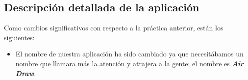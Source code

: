 \documentclass[12pt,a4paper]{article}
\begin{document}
\subsection{Descripción detallada de la aplicación}

Como cambios significativos con respecto a la práctica anterior, están los siguientes:

\begin{itemize}
    \item El nombre de nuestra aplicación ha sido cambiado ya que necesitábamos un nombre que llamara más la atención y atrajera a la gente; el nombre es \textit{\textbf{Air Draw}}.
\end{itemize}
\end{document}
